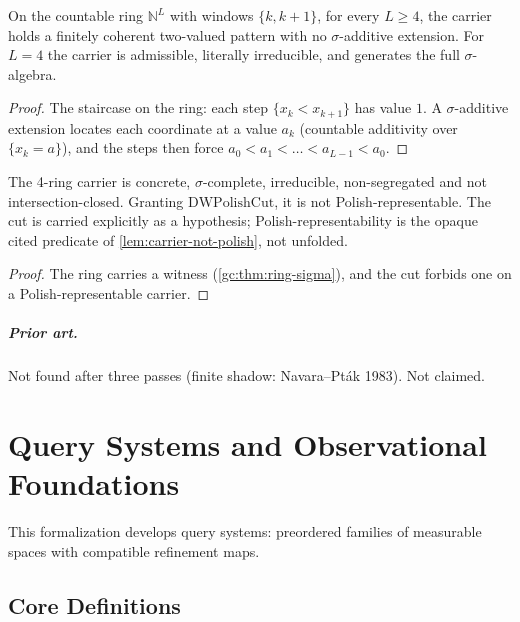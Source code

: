 \begin{theorem}
\label{gc:thm:ring-sigma}
\leanok
{}
On the countable ring $\mathbb N^L$ with windows $\{k,k+1\}$, for every
$L\ge4$, the carrier holds a finitely coherent two-valued pattern with no
$\sigma$-additive extension. For $L=4$ the carrier is admissible, literally
irreducible, and generates the full $\sigma$-algebra.
\end{theorem}
\begin{proof}
\leanok
The staircase on the ring: each step $\{x_k<x_{k+1}\}$ has value $1$. A
$\sigma$-additive extension locates each coordinate at a value $a_k$ (countable
additivity over $\{x_k=a\}$), and the steps then force
$a_0<a_1<\dots<a_{L-1}<a_0$.
\end{proof}

\begin{lemma}
\label{gc:lem:d4-six}
\leanok
The 4-ring carrier is concrete, $\sigma$-complete, irreducible, non-segregated
and not intersection-closed. Granting $\mathrm{DWPolishCut}$, it is not
Polish-representable. The cut is carried explicitly as a hypothesis;
Polish-representability is the opaque cited predicate of
\ref{lem:carrier-not-polish}, not unfolded.
\end{lemma}
\begin{proof}
\leanok
{}
The ring carries a witness (\ref{gc:thm:ring-sigma}), and the cut forbids one on
a Polish-representable carrier.
\end{proof}
\paragraph{Prior art.} Not found after three passes (finite shadow:
Navara--Pták 1983). Not claimed.

\chapter{Query Systems and Observational Foundations}

This formalization develops query systems: preordered families of measurable spaces with compatible refinement maps.

\section{Core Definitions}

